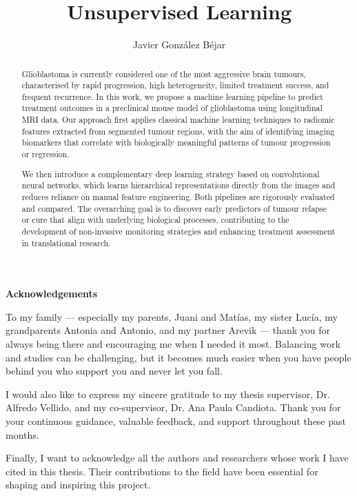 \documentclass[12pt, a4paper]{report}
\title{Unsupervised Learning}
\author{
    Javier González Béjar
}
\newcommand\blankpage{%
    \null
    \thispagestyle{empty}%
    \addtocounter{page}{-1}%
    \newpage}
\begin{document}
 

\afterpage{\blankpage} %
\clearpage %

\newpage  %

\textbf{Acknowledgements}

To my family — especially my parents, Juani and Matías, my sister Lucía, my grandparents Antonia and Antonio, and my partner Arevik — thank you for always being there and encouraging me when I needed it most. Balancing work and studies can be challenging, but it becomes much easier when you have people behind you who support you and never let you fall.

I would also like to express my sincere gratitude to my thesis supervisor, Dr. Alfredo Vellido, and my co-supervisor, Dr. Ana Paula Candiota. Thank you for your continuous guidance, valuable feedback, and support throughout these past months.

Finally, I want to acknowledge all the authors and researchers whose work I have cited in this thesis. Their contributions to the field have been essential for shaping and inspiring this project.

\newpage  %
\begin{abstract}
Glioblastoma is currently considered one of the most aggressive brain tumours, characterised by rapid progression, high heterogeneity, limited treatment success, and frequent recurrence. In this work, we propose a machine learning pipeline to predict treatment outcomes in a preclinical mouse model of glioblastoma using longitudinal MRI data. Our approach first applies classical machine learning techniques to radiomic features extracted from segmented tumour regions, with the aim of identifying imaging biomarkers that correlate with biologically meaningful patterns of tumour progression or regression.

We then introduce a complementary deep learning strategy based on convolutional neural networks, which learns hierarchical representations directly from the images and reduces reliance on manual feature engineering. Both pipelines are rigorously evaluated and compared. The overarching goal is to discover early predictors of tumour relapse or cure that align with underlying biological processes, contributing to the development of non-invasive monitoring strategies and enhancing treatment assessment in translational research.
\end{abstract}
\end{document}
